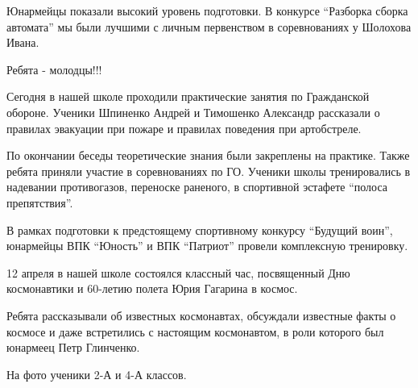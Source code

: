Юнармейцы показали высокий уровень подготовки. В конкурсе \enquote{Разборка
сборка автомата} мы были лучшими с личным первенством в соревнованиях у
Шолохова Ивана. 

Ребята - молодцы!!!



Сегодня в нашей школе проходили практические занятия по Гражданской обороне.
Ученики Шпиненко Андрей и Тимошенко Александр рассказали о правилах эвакуации
при пожаре и правилах поведения при артобстреле.

По окончании беседы теоретические знания были закреплены на практике. Также
ребята приняли участие в соревнованиях по ГО. Ученики школы тренировались в
надевании противогазов, переноске раненого, в спортивной эстафете \enquote{полоса
препятствия}.

В рамках подготовки к предстоящему спортивному конкурсу \enquote{Будущий воин},
юнармейцы ВПК \enquote{Юность} и ВПК \enquote{Патриот} провели комплексную тренировку.



12 апреля  в нашей школе состоялся классный час, посвященный Дню космонавтики и
60-летию полета Юрия Гагарина в космос.

Ребята рассказывали об известных космонавтах, обсуждали известные факты о
космосе и даже встретились с настоящим космонавтом, в роли которого был
юнармеец Петр Глинченко.

На фото ученики 2-А и 4-А классов.

